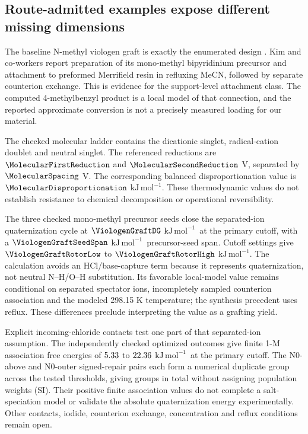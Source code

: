 \documentclass[11pt]{article}
\newcommand{\kj}{\ensuremath{\mathrm{kJ\,mol^{-1}}}}
\begin{document}
\subsection{Route-admitted examples expose different missing dimensions}
The baseline N-methyl viologen graft is exactly the enumerated design . Kim and co-workers report preparation of its mono-methyl bipyridinium precursor and attachment to preformed Merrifield resin in refluxing MeCN, followed by separate counterion exchange.\cite{kim2022} This is evidence for the support-level attachment class. The computed 4-methylbenzyl product is a local model of that connection, and the reported approximate conversion is not a precisely measured loading for our material.

The checked molecular ladder contains the dicationic singlet, radical-cation doublet and neutral singlet. The referenced reductions are $\MolecularFirstReduction$ and $\MolecularSecondReduction$ V, separated by $\MolecularSpacing$ V. The corresponding balanced disproportionation value is $\MolecularDisproportionation$ \kj. These thermodynamic values do not establish resistance to chemical decomposition or operational reversibility.

The three checked mono-methyl precursor seeds close the separated-ion quaternization cycle at $\ViologenGraftDG$ \kj\ at the primary cutoff, with a $\ViologenGraftSeedSpan$ \kj\ precursor-seed span. Cutoff settings give $\ViologenGraftRotorLow$ to $\ViologenGraftRotorHigh$ \kj. The calculation avoids an HCl/base-capture term because it represents quaternization, not neutral N--H/O--H substitution. Its favorable local-model value remains conditional on separated spectator ions, incompletely sampled counterion association and the modeled 298.15 K temperature; the synthesis precedent uses reflux. These differences preclude interpreting the value as a grafting yield.

Explicit incoming-chloride contacts test one part of that separated-ion assumption. The \ChlorideOutcomeCount{} independently checked optimized outcomes give finite 1-M association free energies of $5.33$ to $22.36$ \kj\ at the primary cutoff. The N0-above and N0-outer signed-repair pairs each form a numerical duplicate group across the tested thresholds, giving \ChlorideDuplicateCount{} groups in total without assigning population weights (SI). Their positive finite association values do not complete a salt-speciation model or validate the absolute quaternization energy experimentally. Other contacts, iodide, counterion exchange, concentration and reflux conditions remain open.
\end{document}
